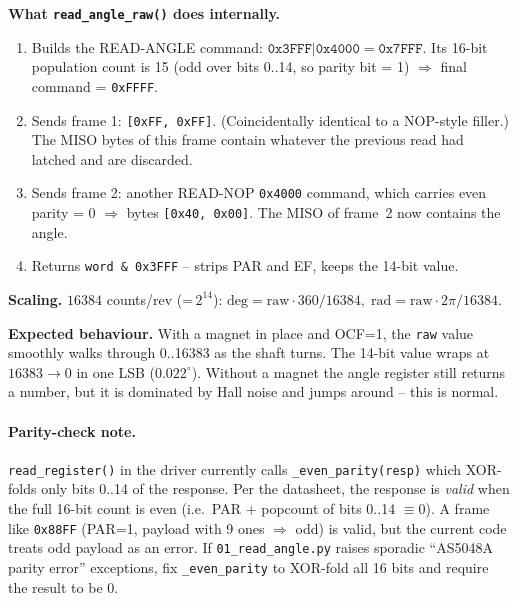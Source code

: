 \documentclass[11pt,a4paper]{article}
\begin{document}
\textbf{What \texttt{read\_angle\_raw()} does internally.}
\begin{enumerate}
  \item Builds the READ-ANGLE command:
        \(\texttt{0x3FFF} | \texttt{0x4000} = \texttt{0x7FFF}\).
        Its 16-bit population count is 15 (odd over bits 0..14, so
        parity bit = 1) $\Rightarrow$ final command = \texttt{0xFFFF}.
  \item Sends frame 1: \texttt{[0xFF, 0xFF]}.  (Coincidentally
        identical to a NOP-style filler.)  The MISO bytes of this
        frame contain whatever the previous read had latched and are
        discarded.
  \item Sends frame 2: another READ-NOP \texttt{0x4000} command,
        which carries even parity = 0 $\Rightarrow$ bytes
        \texttt{[0x40, 0x00]}.  The MISO of frame~2 now contains the
        angle.
  \item Returns \texttt{word \& 0x3FFF} -- strips PAR and EF, keeps
        the 14-bit value.
\end{enumerate}

\textbf{Scaling.}  $16384$ counts/rev (=\,$2^{14}$):
\(\text{deg} = \text{raw}\cdot 360/16384,\;
\text{rad} = \text{raw}\cdot 2\pi/16384.\)

\textbf{Expected behaviour.}  With a magnet in place and OCF=1, the
\texttt{raw} value smoothly walks through 0..16383 as the shaft turns.
The 14-bit value wraps at $16383 \to 0$ in one LSB ($0.022^{\circ}$).
Without a magnet the angle register still returns a number, but it is
dominated by Hall noise and jumps around -- this is normal.

\paragraph{Parity-check note.}  \texttt{read\_register()} in the
driver currently calls \texttt{\_even\_parity(resp)} which XOR-folds
only bits 0..14 of the response.  Per the datasheet, the response is
\emph{valid} when the full 16-bit count is even (i.e.\ PAR + popcount
of bits 0..14 $\equiv 0$).  A frame like \texttt{0x88FF} (PAR=1,
payload with 9 ones $\Rightarrow$ odd) is valid, but the current code
treats odd payload as an error.  If \texttt{01\_read\_angle.py} raises
sporadic ``AS5048A parity error'' exceptions, fix
\texttt{\_even\_parity} to XOR-fold all 16 bits and require the result
to be 0.

\end{document}
